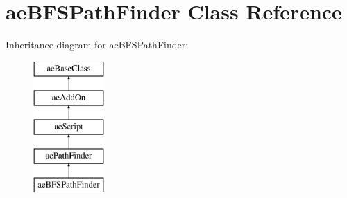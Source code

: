 \hypertarget{classae_b_f_s_path_finder}{}\section{ae\+B\+F\+S\+Path\+Finder Class Reference}
\label{classae_b_f_s_path_finder}
Inheritance diagram for ae\+B\+F\+S\+Path\+Finder\+:\begin{figure}[H]
\begin{center}
\leavevmode
\includegraphics[height=5.000000cm]{classae_b_f_s_path_finder}
\end{center}
\end{figure}
